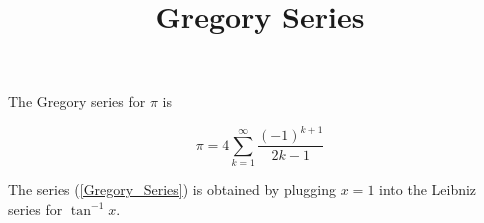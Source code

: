 \documentclass[11pt]{article}
\begin{document}
\title{Gregory Series}
\author{}
\date{}
\maketitle

The Gregory series for $\pi$ is

\begin{equation}
\pi = 4 \sum_{k=1}^{\infty} \frac{(-1)^{k+1}}{2k-1} \label{Gregory_Series}
\end{equation}

The series (\ref{Gregory_Series}) is obtained by plugging $x=1$ into the Leibniz series for $\tan^{-1}x$.
\end{document}
